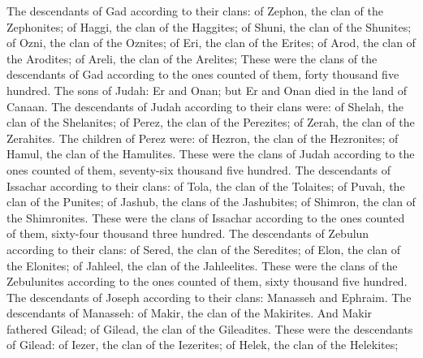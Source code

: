 \begin{biblechapter}
\verse The descendants of Gad according to their clans: of Zephon, the clan of the Zephonites; of Haggi, the clan of the Haggites; of Shuni, the clan of the Shunites;
\verse of Ozni, the clan of the Oznites; of Eri, the clan of the Erites;
\verse of Arod, the clan of the Arodites; of Areli, the clan of the Arelites;
\verse These were the clans of the descendants of Gad according to the ones counted of them, forty thousand five hundred.
\verse The sons of Judah: Er and Onan; but Er and Onan died in the land of Canaan.
\verse The descendants of Judah according to their clans were: of Shelah, the clan of the Shelanites; of Perez, the clan of the Perezites; of Zerah, the clan of the Zerahites.
\verse The children of Perez were: of Hezron, the clan of the Hezronites; of Hamul, the clan of the Hamulites.
\verse These were the clans of Judah according to the ones counted of them, seventy-six thousand five hundred.
\verse The descendants of Issachar according to their clans: of Tola, the clan of the Tolaites; of Puvah, the clan of the Punites;
\verse of Jashub, the clans of the Jashubites; of Shimron, the clan of the Shimronites.
\verse These were the clans of Issachar according to the ones counted of them, sixty-four thousand three hundred.
\verse The descendants of Zebulun according to their clans: of Sered, the clan of the Seredites; of Elon, the clan of the Elonites; of Jahleel, the clan of the Jahleelites.
\verse These were the clans of the Zebulunites according to the ones counted of them, sixty thousand five hundred.
\verse The descendants of Joseph according to their clans: Manasseh and Ephraim.
\verse The descendants of Manasseh: of Makir, the clan of the Makirites. And Makir fathered Gilead; of Gilead, the clan of the Gileadites.
\verse These were the descendants of Gilead: of Iezer, the clan of the Iezerites; of Helek, the clan of the Helekites;

\end{biblechapter}
